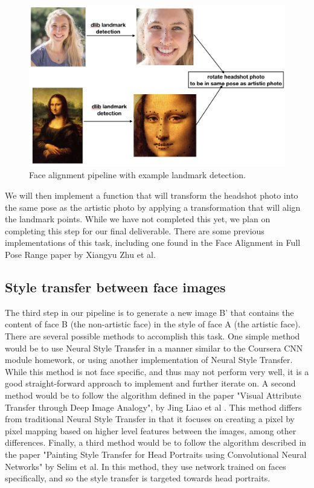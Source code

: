 \documentclass{pnastwo2}
\begin{document}
\begin{article}
\begin{figure}[ht]
	\begin{center}
		\includegraphics[width=.4\textwidth]{landmark_id}
		\caption{Face alignment pipeline with example landmark detection.} \label{fig:nst}
	\end{center}
\end{figure} 

We will then implement a function that will transform the headshot photo into the same pose as the artistic photo by applying a transformation that will align the landmark points. While we have not completed this yet, we plan on completing this step for our final deliverable. There are some previous implementations of this task, including one found in the Face Alignment in Full Pose Range paper by Xiangyu Zhu et al. \cite {zhu2019face}

\subsection{Style transfer between face images}

The third step in our pipeline is to generate a new image B' that contains the content of face B (the non-artistic face) in the style of face A (the artistic face). There are several possible methods to accomplish this task. One simple method would be to use Neural Style Transfer in a manner similar to the Coursera CNN module homework, or using another implementation of Neural Style Transfer. While this method is not face specific, and thus may not perform very well, it is a good straight-forward approach to implement and further iterate on. A second method would be to follow the algorithm defined in the paper "Visual Attribute Transfer through Deep Image Analogy", by Jing Liao et al \cite{liao2017visual}. This method differs from traditional Neural Style Transfer in that it focuses on creating a pixel by pixel mapping based on higher level features between the images, among other differences. Finally, a third method would be to follow the algorithm described in the paper "Painting Style Transfer for Head Portraits using Convolutional Neural Networks" by Selim et al. \cite{} In this method, they use network trained on faces specifically, and so the style transfer is targeted towards head portraits.


\end{article}
\end{document}
